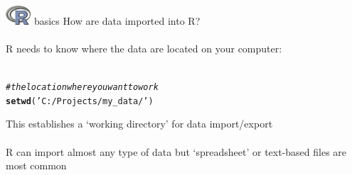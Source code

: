 \documentclass[xcolor=svgnames]{beamer}\usepackage[]{graphicx}\usepackage[]{color}
\makeatletter
\newcommand{\hlstr}[1]{\textcolor[rgb]{0.192,0.494,0.8}{#1}}%
\newcommand{\hlcom}[1]{\textcolor[rgb]{0.678,0.584,0.686}{\textit{#1}}}%
\newcommand{\hlstd}[1]{\textcolor[rgb]{0.345,0.345,0.345}{#1}}%
\newcommand{\hlkwd}[1]{\textcolor[rgb]{0.737,0.353,0.396}{\textbf{#1}}}%
\newenvironment{kframe}{%
 \def\at@end@of@kframe{}%
 \ifinner\ifhmode%
  \def\at@end@of@kframe{\end{minipage}}%
  \begin{minipage}{\columnwidth}%
 \fi\fi%
 \def\FrameCommand##1{\hskip\@totalleftmargin \hskip-\fboxsep
 \colorbox{shadecolor}{##1}\hskip-\fboxsep
     \hskip-\linewidth \hskip-\@totalleftmargin \hskip\columnwidth}%
 \MakeFramed {\advance\hsize-\width
   \@totalleftmargin\z@ \linewidth\hsize
   \@setminipage}}%
 {\par\unskip\endMakeFramed%
 \at@end@of@kframe}
\newenvironment{knitrout}{}{} %
\makeatother
\begin{document}
\begin{frame}[t,fragile]{\includegraphics[width=0.07\textwidth]{Rlogo.jpg} \hspace{0.01in} basics}
How are data imported into R?\\~\\
R needs to know where the data are located on your computer:\\~\\
\begin{knitrout}
\color{fgcolor}\begin{kframe}
\begin{alltt}
\hlcom{# the location where you want to work}
\hlkwd{setwd}\hlstd{(}\hlstr{'C:/Projects/my_data/'}\hlstd{)}
\end{alltt}
\end{kframe}
\end{knitrout}
\vspace{0.2in}
This establishes a `working directory' for data import/export\\~\\
R can import almost any type of data but `spreadsheet' or text-based files are most common
\end{frame}
\end{document}
